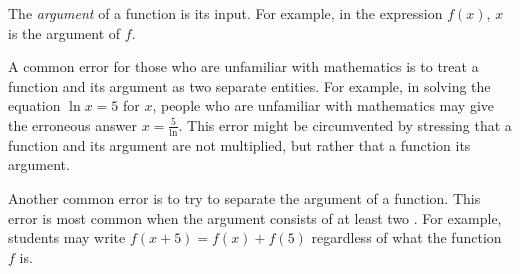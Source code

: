 \documentclass[12pt]{article}
\begin{document}
The {\sl argument\/} of a function is its input.  For example, in the expression $f(x)$, $x$ is the argument of $f$.

A common error for those who are unfamiliar with mathematics is to treat a function and its argument as two separate entities.  For example, in solving the equation $\ln x=5$ for $x$, people who are unfamiliar with mathematics may give the erroneous answer $\displaystyle x=\frac{5}{\ln}$.  This error might be circumvented by stressing that a function and its argument are not multiplied, but rather that a function  its argument.

Another common error is to try to separate the argument of a function.  This error is most common when the argument consists of at least two .  For example, students may write $f(x+5)=f(x)+f(5)$ regardless of what the function $f$ is.
\end{document}
